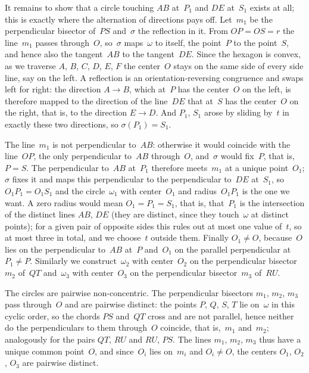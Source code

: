 {    It remains to show that a circle touching $AB$ at~$P_1$ and $DE$ at~$S_1$ exists at all; this is exactly where the alternation of directions pays off. Let~$m_1$ be the perpendicular bisector of~$PS$ and~$\sigma$ the reflection in it. From $OP = OS = r$ the line~$m_1$ passes through~$O$, so~$\sigma$ maps~$\omega$ to itself, the point~$P$ to the point~$S$, and hence also the tangent~$AB$ to the tangent~$DE$. Since the hexagon is convex, as we traverse $A$, $B$, $C$, $D$, $E$, $F$ the center~$O$ stays on the same side of every side line, say on the left. A reflection is an orientation-reversing congruence and swaps left for right: the direction $A \to B$, which at~$P$ has the center~$O$ on the left, is therefore mapped to the direction of the line~$DE$ that at~$S$ has the center~$O$ on the right, that is, to the direction $E \to D$. And $P_1$, $S_1$ arose by sliding by~$t$ in exactly these two directions, so $\sigma(P_1) = S_1$.

    The line~$m_1$ is not perpendicular to~$AB$: otherwise it would coincide with the line~$OP$, the only perpendicular to~$AB$ through~$O$, and~$\sigma$ would fix~$P$, that is, $P = S$. The perpendicular to~$AB$ at~$P_1$ therefore meets~$m_1$ at a unique point~$O_1$; $\sigma$ fixes it and maps this perpendicular to the perpendicular to~$DE$ at~$S_1$, so $O_1P_1 = O_1S_1$ and the circle~$\omega_1$ with center~$O_1$ and radius~$O_1P_1$ is the one we want. A zero radius would mean $O_1 = P_1 = S_1$, that is, that~$P_1$ is the intersection of the distinct lines $AB$, $DE$ (they are distinct, since they touch~$\omega$ at distinct points); for a given pair of opposite sides this rules out at most one value of~$t$, so at most three in total, and we choose~$t$ outside them. Finally $O_1 \neq O$, because~$O$ lies on the perpendicular to~$AB$ at~$P$ and~$O_1$ on the parallel perpendicular at $P_1 \neq P$. Similarly we construct~$\omega_2$ with center~$O_2$ on the perpendicular bisector~$m_2$ of~$QT$ and~$\omega_3$ with center~$O_3$ on the perpendicular bisector~$m_3$ of~$RU$.

    The circles are pairwise non-concentric. The perpendicular bisectors $m_1$, $m_2$, $m_3$ pass through~$O$ and are pairwise distinct: the points $P$, $Q$, $S$, $T$ lie on~$\omega$ in this cyclic order, so the chords $PS$ and~$QT$ cross and are not parallel, hence neither do the perpendiculars to them through~$O$ coincide, that is,~$m_1$ and~$m_2$; analogously for the pairs $QT$, $RU$ and $RU$, $PS$. The lines $m_1$, $m_2$, $m_3$ thus have a unique common point~$O$, and since~$O_i$ lies on~$m_i$ and $O_i \neq O$, the centers $O_1$, $O_2$, $O_3$ are pairwise distinct.

}
